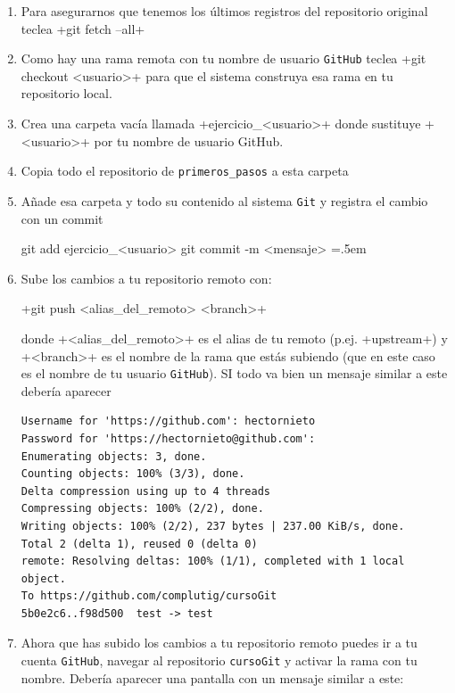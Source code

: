 \documentclass[a5paper, oneside,10pt]{article}
\newenvironment{cverbatim}
 {\SaveVerbatim{cverb}}
 {\endSaveVerbatim
  \flushleft\fboxrule=0pt\fboxsep=.5em
  \colorbox{bg}{\BUseVerbatim{cverb}}%
  \endflushleft
}
\begin{document}
    \begin{enumerate}
     \item Para asegurarnos que tenemos los últimos registros del repositorio original teclea \cverb+git fetch --all+
     
     \item Como hay una rama remota con tu nombre de usuario \verb+GitHub+ teclea \cverb+git checkout <usuario>+ para que el sistema construya esa rama en tu repositorio local.
     
     \item Crea una carpeta vacía llamada \cverb+ejercicio_<usuario>+ donde sustituye \cverb+<usuario>+ por tu nombre de usuario GitHub.
     
     \item Copia todo el repositorio de \verb+primeros_pasos+ a esta carpeta
     
     \item Añade esa carpeta y todo su contenido al sistema \verb+Git+ y registra el cambio con un commit
     
     \begin{cverbatim}
git add ejercicio_<usuario>
git commit -m <mensaje>
     \end{cverbatim}
     
     \item Sube los cambios a tu repositorio remoto con:
     
     \cverb+git push <alias_del_remoto> <branch>+
     
     donde \cverb+<alias_del_remoto>+ es el alias de tu remoto (p.ej. \cverb+upstream+) y \cverb+<branch>+ es el nombre de la rama que estás subiendo (que en este caso es el nombre de tu usuario \verb+GitHub+). SI todo va bien un mensaje similar a este debería aparecer
     
     \begin{lstlisting}[style=custom]
Username for 'https://github.com': hectornieto
Password for 'https://hectornieto@github.com': 
Enumerating objects: 3, done.
Counting objects: 100% (3/3), done.
Delta compression using up to 4 threads
Compressing objects: 100% (2/2), done.
Writing objects: 100% (2/2), 237 bytes | 237.00 KiB/s, done.
Total 2 (delta 1), reused 0 (delta 0)
remote: Resolving deltas: 100% (1/1), completed with 1 local object.
To https://github.com/complutig/cursoGit
5b0e2c6..f98d500  test -> test
     \end{lstlisting}
     
     \item Ahora que has subido los cambios a tu repositorio remoto puedes ir a tu cuenta \verb+GitHub+, navegar al repositorio \verb+cursoGit+ y activar la rama con tu nombre. Debería aparecer una pantalla con un mensaje similar a este:
     

\end{enumerate}
\end{document}

